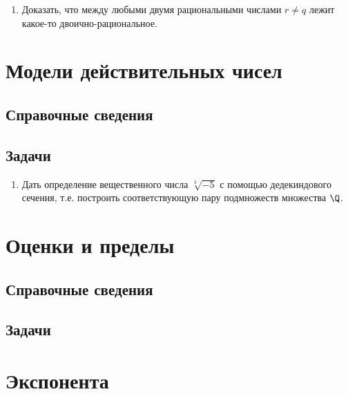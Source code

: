 \begin{enumerate}
\item Доказать, что между любыми двумя рациональными числами $r\ne q$ лежит какое-то двоично-рациональное.
\end{enumerate}


\section{Модели действительных чисел}

\subsection*{Справочные сведения}

\subsection*{Задачи}

\begin{enumerate}
\item Дать определение вещественного числа $\sqrt[3]{-5}$ с помощью дедекиндового сечения, т.е. построить соответствующую пару подмножеств множества $\Q$.
\end{enumerate}

\section{Оценки и пределы}

\subsection*{Справочные сведения}

\subsection*{Задачи}


\section{Экспонента}

